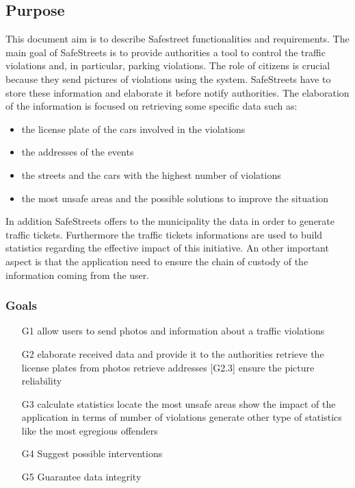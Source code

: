 \subsection{Purpose}
This document aim is to describe Safestreet functionalities and requirements.
The main goal of SafeStreets is to provide authorities a tool to control the traffic violations and, in particular, parking violations. The role of citizens is crucial because they send pictures of violations using the system. SafeStreets have to store these information and elaborate it before notify authorities.
The elaboration of the information is focused on retrieving some specific data such as:
\begin{itemize}
	\item
	the license plate of the cars involved in the violations
	\item
	the addresses of the events
	\item 
	the streets and the cars with the highest number of violations
	\item 
	the most unsafe areas and the possible solutions to improve the situation
\end{itemize}
In addition SafeStreets offers to the municipality the data in order to generate traffic tickets. Furthermore the traffic tickets informations are used to build statistics regarding the effective impact of this initiative.
An other important aspect is that the application need to ensure the chain of custody of the information coming from the user.
\subsubsection{Goals}
\begin{itemize}
	\item
	[G1] allow users to send photos and information about a traffic violations
	\item 
	[G2] elaborate received data and provide it to the authorities
		\subitem 
		[G2.1] retrieve the license plates from photos
		\subitem
		[G2.2] retrieve addresses
		[G2.3] ensure the picture reliability
	\item
	[G3] calculate statistics
		\subitem
		[G3.1] locate the most unsafe areas
		\subitem
		[G3.2] show the impact of the application in terms of number of violations
		\subitem
		[G3.3] generate other type of statistics like the most egregious offenders
	\item
	[G4] Suggest possible interventions
	\item
	[G5] Guarantee data integrity
		
\end{itemize}
